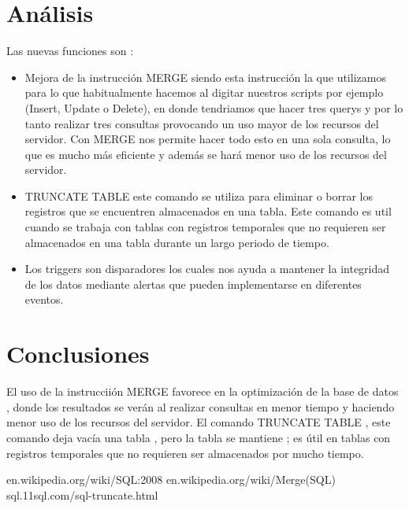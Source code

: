 \documentclass{article}
\begin{document}
\section{Análisis}
Las nuevas funciones son :
\begin{itemize}
\item Mejora de la instrucción MERGE siendo esta instrucción la que utilizamos para lo que habitualmente hacemos al digitar nuestros scripts por ejemplo (Insert, Update o Delete), en donde tendriamos que hacer tres querys y por lo tanto realizar tres consultas provocando un uso mayor de los recursos del servidor. Con MERGE nos permite hacer todo esto en una sola consulta, lo que es mucho más eficiente y además se hará menor uso de los recursos del servidor.
\item TRUNCATE TABLE este comando se utiliza para eliminar o borrar los registros que se encuentren almacenados en una tabla. Este comando es util cuando se trabaja con tablas con registros temporales que no requieren ser almacenados en una tabla durante un largo periodo de tiempo.
\item Los triggers son disparadores los cuales nos ayuda a mantener la integridad de los datos mediante alertas que pueden implementarse en diferentes eventos.
\end{itemize}
\section{Conclusiones}
El uso de la instrucciión MERGE favorece en la optimización de la base de datos , donde los resultados se verán al realizar consultas en menor tiempo y haciendo menor uso de los recursos del servidor.
El comando TRUNCATE TABLE , este comando deja vacía una tabla , pero la tabla se mantiene ; es útil en tablas con registros temporales que no requieren ser almacenados por mucho tiempo.
\begin{thebibliography}{}
\bibitem {}
\newblock en.wikipedia.org/wiki/SQL:2008
\bibitem {}
\newblock en.wikipedia.org/wiki/Merge(SQL)
\bibitem {}
\newblock sql.11sql.com/sql-truncate.html
\end{thebibliography}
\end{document}
